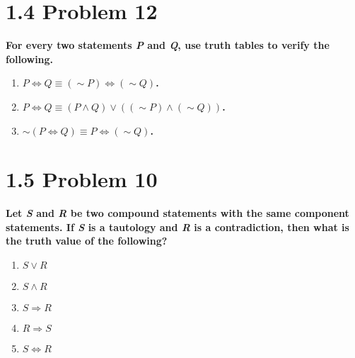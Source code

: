 \documentclass[10pt]{article}
\begin{document}
\section{1.4 Problem 12}
\textbf{For every two statements \textit{P} and \textit{Q}, use truth tables to
verify the following.}

\begin{enumerate}[label=(\alph*)]

    \item \textbf{$P \Leftrightarrow Q \equiv (\sim P) \Leftrightarrow (\sim Q)$.}

    \item \textbf{$P \Leftrightarrow Q \equiv (P \wedge Q) \vee ((\sim P) \wedge
        (\sim Q))$.}

    \item \textbf{$\sim (P \Leftrightarrow Q) \equiv P \Leftrightarrow (\sim Q)$.}

\end{enumerate}



\section{1.5 Problem 10}
\textbf{Let \textit{S} and \textit{R} be two compound statements with the same
component statements. If \textit{S} is a tautology and \textit{R} is a contradiction,
then what is the truth value of the following?}

\begin{enumerate}[label=(\alph*)]
    
    \item \textbf{$S \vee R$}

    \item \textbf{$S \wedge R$}

    \item \textbf{$S \Rightarrow R$}

    \item \textbf{$R \Rightarrow S$}

    \item \textbf{$S \Leftrightarrow R$}

\end{enumerate}
\end{document}
